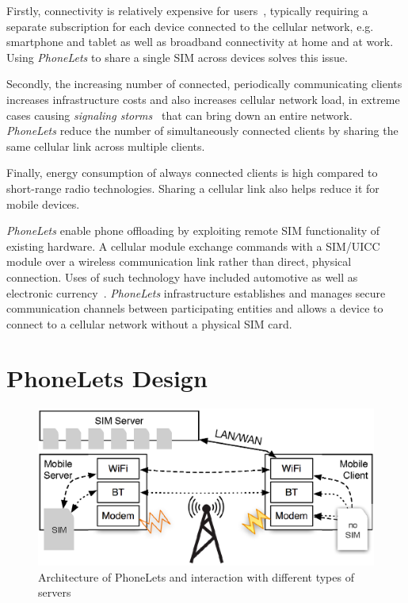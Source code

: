 \documentclass{sig-alternate-2013}
\begin{document}
Firstly, connectivity is relatively expensive for users~\cite{Anonymous:2013ut}, typically requiring a separate subscription for each device connected to the cellular network, e.g. smartphone and tablet as well as broadband connectivity at home and at work. Using \emph{PhoneLets} to share a single SIM across devices solves this issue.

Secondly, the increasing number of connected, periodically communicating clients increases infrastructure costs and also increases cellular network load, in extreme cases causing \emph{signaling storms}~\cite{Yang:wh} that can bring down an entire network. \emph{PhoneLets} reduce the number of simultaneously connected clients by sharing the same cellular link across multiple clients.

Finally, energy consumption of always connected clients is high compared to short-range radio technologies. Sharing a cellular link also helps reduce it for mobile devices.

\emph{PhoneLets} enable phone offloading by exploiting remote SIM functionality of existing hardware. A cellular module exchange commands with a SIM/UICC module over a wireless communication link rather than direct, physical connection. Uses of such technology have included automotive as well as electronic currency~\cite{subramanian2003sim}. \emph{PhoneLets} infrastructure establishes and manages secure communication channels between participating entities and allows a device to connect to a cellular network without a physical SIM card.


\section{PhoneLets Design}

\begin{figure}
\centering
\includegraphics[width=0.9\columnwidth]{figs/arch}
\caption{Architecture of PhoneLets and interaction with different types of servers}
\label{fig:arch}
\end{figure}
\end{document}
